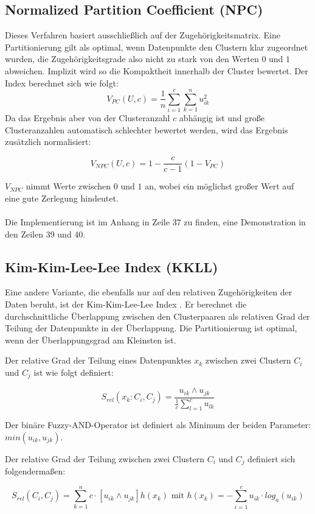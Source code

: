 \documentclass[11pt,ceqn]{book}
\begin{document}
\subsection{Normalized Partition Coefficient (NPC)}
Dieses Verfahren \cite{npc} basiert ausschließlich auf der Zugehörigkeitsmatrix. Eine Partitionierung gilt als optimal, wenn Datenpunkte den Clustern klar zugeordnet wurden, die Zugehörigkeitsgrade also nicht zu stark von den Werten $0$ und $1$ abweichen. Implizit wird so die Kompaktheit innerhalb der Cluster bewertet. Der Index berechnet sich wie folgt:
$$V_{PC}(U,c) = \frac{1}{n} \sum\limits_{i=1}^c \sum\limits_{k=1}^n u_{ik}^2$$
Da das Ergebnis aber von der Clusteranzahl $c$ abhängig ist und große Clusteranzahlen automatisch schlechter bewertet werden, wird das Ergebnis zusätzlich normalisiert:

$$V_{NPC}(U,c) = 1- \frac{c}{c-1}\left(1-V_{PC}\right)$$

$V_{NPC}$ nimmt Werte zwischen $0$ und $1$ an, wobei ein möglichst großer Wert auf eine gute Zerlegung hindeutet.
\\~\\
Die Implementierung ist im Anhang in Zeile 37 zu finden, eine Demonstration in den Zeilen 39 und 40.

\subsection{Kim-Kim-Lee-Lee Index (KKLL)}
Eine andere Variante, die ebenfalls nur auf den relativen Zugehörigkeiten der Daten beruht, ist der Kim-Kim-Lee-Lee Index \cite{kkll}. Er berechnet die durchschnittliche Überlappung zwischen den Clusterpaaren als relativen Grad der Teilung der Datenpunkte in der Überlappung. Die Partitionierung ist optimal, wenn der Überlappungsgrad am Kleinsten ist.

Der relative Grad der Teilung eines Datenpunktes $x_k$ zwischen zwei
Clustern $C_i$ und $C_j$ ist wie folgt definiert:

$$S_{rel}(x_k\colon C_i,C_j) = \frac{u_{ik} \land u_{jk}}{\frac{1}{c} \sum\limits_{l=1}^c u_{lk}}$$

Der binäre Fuzzy-AND-Operator ist definiert als Minimum der beiden Parameter: $min(u_{ik}, u_{jk})$.

Der relative Grad der Teilung zwischen zwei Clustern $C_i$ und $C_j$ definiert sich folgendermaßen:

$$S_{rel}(C_i,C_j) = \sum_{k=1}^n c\cdot \left[u_{ik} \land u_{jk}\right] h(x_k) \text{ mit } h(x_k) = -\sum_{i=1}^c u_{ik}\cdot log_a(u_{ik})$$
\end{document}
